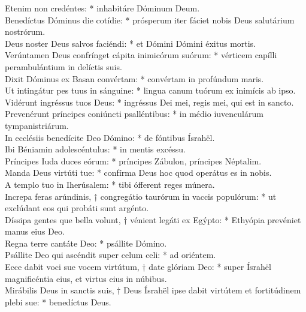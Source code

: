 {	Etenim non credéntes: * inhabitáre Dóminum Deum. \\
	Benedíctus Dóminus die cotídie: * prósperum iter fáciet nobis Deus salutárium nostrórum. \\
	Deus noster Deus salvos faciéndi: * et Dómini Dómini éxitus mortis. \\
	Verúntamen Deus confrínget cápita inimicórum suórum: * vérticem capílli perambulántium in delíctis suis. \\
	Dixit Dóminus ex Basan convértam: * convértam in profúndum maris. \\
	Ut intingátur pes tuus in sánguine: * lingua canum tuórum ex inimícis ab ipso. \\
	Vidérunt ingréssus tuos Deus: * ingréssus Dei mei, regis mei, qui est in sancto. \\
	Prevenérunt príncipes coniúncti psalléntibus: * in médio iuvenculárum tympanistriárum. \\
	In ecclésiis benedícite Deo Dómino: * de fóntibus Ísrahël. \\
	Ibi Béniamin adolescéntulus: * in mentis excéssu. \\
	Príncipes Iuda duces eórum: * príncipes Zábulon, príncipes Néptalim. \\
	Manda Deus virtúti tue: * confírma Deus hoc quod operátus es in nobis. \\
	A templo tuo in Iherúsalem: * tibi ófferent reges múnera. \\
	Increpa feras arúndinis, † congregátio taurórum in vaccis populórum: * ut exclúdant eos qui probáti sunt argénto. \\
	Díssipa gentes que bella volunt, † vénient legáti ex Egýpto: * Ethyópia prevéniet manus eius Deo. \\
	Regna terre cantáte Deo: * psállite Dómino. \\
	Psállite Deo qui ascéndit super celum celi: * ad oriéntem. \\
	Ecce dabit voci sue vocem virtútum, † date glóriam Deo: * super Ísrahël magnificéntia eius, et virtus eius in núbibus. \\%
	Mirábilis Deus in sanctis suis, † Deus Ísrahël ipse dabit virtútem et fortitúdinem plebi sue: * benedíctus Deus.
}

